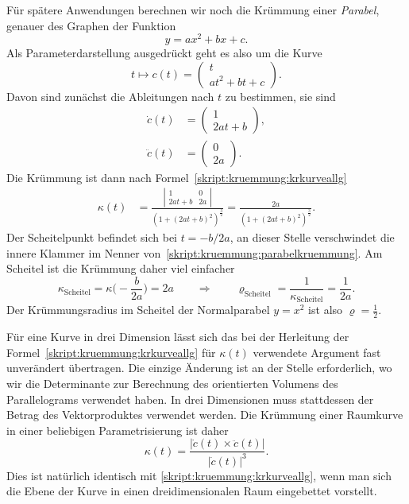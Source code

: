 \begin{beispiel}
Für spätere Anwendungen berechnen wir noch die Krümmung einer {\em Parabel},
genauer des Graphen der Funktion
\[
y = ax^2 + bx + c.
\]
Als Parameterdarstellung ausgedrückt geht es also um die Kurve
\[
t\mapsto c(t)
=
\begin{pmatrix}
t\\
at^2+bt+c
\end{pmatrix}.
\]
Davon sind zunächst die Ableitungen nach $t$ zu bestimmen, sie sind
\begin{align*}
\dot c(t)
&=
\begin{pmatrix}1\\2at+b\end{pmatrix},
\\
\ddot c(t)
&=
\begin{pmatrix}0\\2a\end{pmatrix}.
\end{align*}
Die Krümmung ist dann nach Formel~\ref{skript:kruemmung:krkurveallg}
\begin{align}
\kappa(t)
&=
\frac{\left|\begin{matrix}1&0\\2at+b&2a\end{matrix}\right|}{
(1+(2at+b)^2)^{\frac32}
}
=
\frac{2a}{(1+(2at+b)^2)^{\frac32}}.
\label{skript:kruemmung:parabelkruemmung}
\end{align}
Der Scheitelpunkt befindet sich bei $t=-b/2a$, an dieser Stelle verschwindet
die innere Klammer im Nenner von~\eqref{skript:kruemmung:parabelkruemmung}.
Am Scheitel ist die Krümmung daher viel einfacher
\begin{equation}
\kappa_{\text{Scheitel}}
=
\kappa\biggl(-\frac{b}{2a}\biggr)
=
2a
\qquad
\Rightarrow
\qquad
\varrho_{\text{Scheitel}}
=
\frac1{\kappa_{\text{Scheitel}}}
=
\frac1{2a}.
\label{skript:kruemmung:parabel:scheitel}
\end{equation}
Der Krümmungsradius im Scheitel der Normalparabel $y=x^2$ ist also
$\varrho=\frac12$.
\end{beispiel}

Für eine Kurve in drei Dimension lässt sich das bei der Herleitung
der Formel~\eqref{skript:kruemmung:krkurveallg} für $\kappa(t)$
verwendete Argument fast unverändert übertragen.
Die einzige Änderung ist an der Stelle erforderlich, wo wir die Determinante
zur Berechnung des orientierten Volumens des Parallelograms verwendet
haben.
In drei Dimensionen muss stattdessen der Betrag des Vektorproduktes 
verwendet werden.
Die Krümmung einer Raumkurve in einer beliebigen Parametrisierung ist
daher
\begin{equation}
\kappa(t)
=
\frac{|\dot c(t)\times \ddot c(t)|}{|\dot c(t)|^3}.
\label{skript:kruemmung:krkurveallg3d}
\end{equation}
Dies ist natürlich identisch mit \eqref{skript:kruemmung:krkurveallg},
wenn man sich die Ebene der Kurve in einen dreidimensionalen Raum
eingebettet vorstellt.

